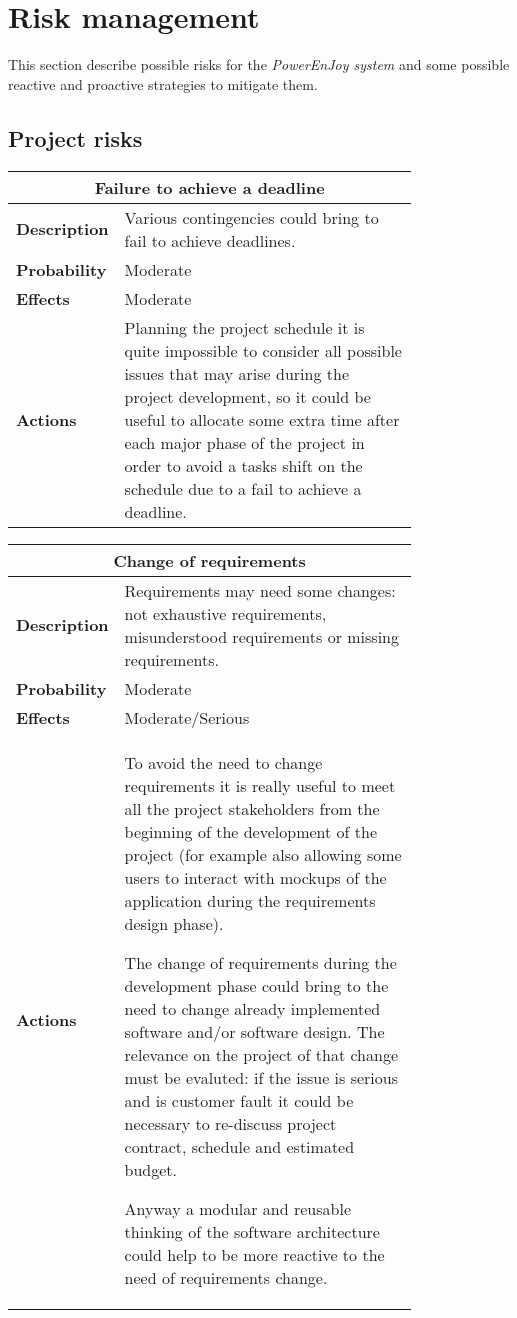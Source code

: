 \section{Risk management}\label{sec:riskManagement}
This section describe possible risks for the \emph{PowerEnJoy system} and some possible reactive and proactive strategies to mitigate them.
\subsection{Project risks}
\begin{longtable}{lp{0.8\linewidth}}
\multicolumn{2}{c}{\textbf{Failure to achieve a deadline}}\\
\toprule
\textbf{Description}& Various contingencies could bring to fail to achieve deadlines. \\
\midrule
\textbf{Probability}&Moderate\\
\midrule
\textbf{Effects}&Moderate\\
\midrule
\textbf{Actions}& Planning the project schedule it is quite impossible to consider all possible issues that may arise during the project development, so it could be useful to allocate some extra time after each major phase of the project in order to avoid a tasks shift on the schedule due to a fail to achieve a deadline.\\
\bottomrule
\end{longtable}
\begin{longtable}{lp{0.8\linewidth}}
\multicolumn{2}{c}{\textbf{Change of requirements}}\\
\toprule
\textbf{Description}& Requirements may need some changes: not exhaustive requirements, misunderstood requirements or missing requirements. \\
\midrule
\textbf{Probability}&Moderate\\
\midrule
\textbf{Effects}&Moderate/Serious\\
\midrule
\textbf{Actions}& To avoid the need to change requirements it is really useful to meet all the project stakeholders from the beginning of the development of the project (for example also allowing some users to interact with mockups of the application during the requirements design phase). 

The change of requirements during the development phase could bring to the need to change already implemented software and/or software design. The relevance on the project of that change must be evaluted: if the issue is serious and is customer fault it could be necessary to re-discuss project contract, schedule and estimated budget. 

Anyway a modular and reusable thinking of the software architecture could help to be more reactive to the need of requirements change.\\
\bottomrule
\end{longtable}


